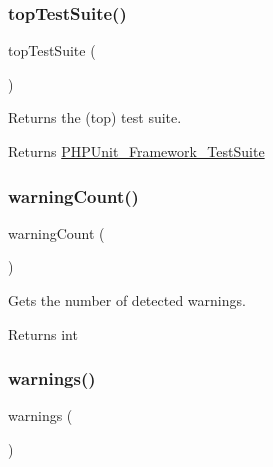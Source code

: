 \subsubsection{\texorpdfstring{top\+Test\+Suite()}{topTestSuite()}}
{\footnotesize\ttfamily top\+Test\+Suite (\begin{DoxyParamCaption}{ }\end{DoxyParamCaption})}

Returns the (top) test suite.

\begin{DoxyReturn}{Returns}
\mbox{\hyperlink{class_p_h_p_unit___framework___test_suite}{P\+H\+P\+Unit\+\_\+\+Framework\+\_\+\+Test\+Suite}} 
\end{DoxyReturn}
\mbox{\label{class_p_h_p_unit___framework___test_result_a4d7b280010e55a2e1507ee27238ae744}} 
\subsubsection{\texorpdfstring{warning\+Count()}{warningCount()}}
{\footnotesize\ttfamily warning\+Count (\begin{DoxyParamCaption}{ }\end{DoxyParamCaption})}

Gets the number of detected warnings.

\begin{DoxyReturn}{Returns}
int 
\end{DoxyReturn}
\mbox{\label{class_p_h_p_unit___framework___test_result_a73ecff6b44e40412d4243afcd0e3fdfc}} 
\subsubsection{\texorpdfstring{warnings()}{warnings()}}
{\footnotesize\ttfamily warnings (\begin{DoxyParamCaption}{ }\end{DoxyParamCaption})}


